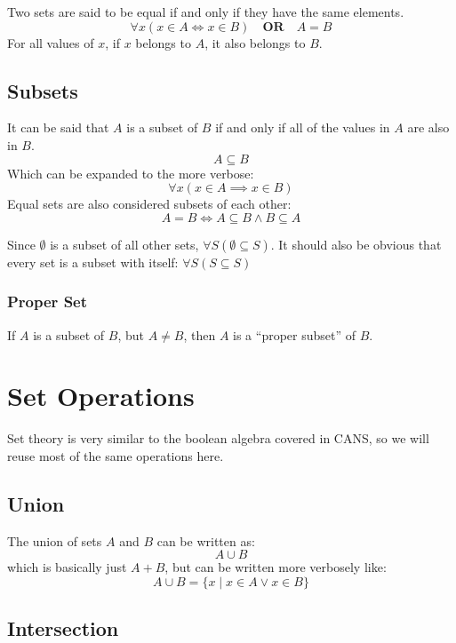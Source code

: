 Two sets are said to be equal if and only if they have the same elements.
\[
    \forall x(x \in A \iff x \in B) \quad \mathrm{\textbf{OR}} \quad A = B
\]
For all values of \(x\), if \(x\) belongs to \(A\), it also belongs to \(B\).

\subsection{Subsets}\label{sub:subsets}

It can be said that \(A\) is a subset of \(B\) if and only if all of the values in \(A\) are also in \(B\).
\[
    A \subseteq B
\]
Which can be expanded to the more verbose:
\[
    \forall x (x \in A \implies x \in B)
\]
Equal sets are also considered subsets of each other:
\[
    A=B \iff A \subseteq B \land B \subseteq A
\]
\begin{note}
    Since \(\emptyset\) is a subset of all other sets, \(\forall S(\emptyset \subseteq S)\).
    It should also be obvious that every set is a subset with itself: \(\forall S ( S \subseteq S )\)
\end{note}

\subsubsection{Proper Set}\label{ssub:proper_set}

If \(A\) is a subset of \(B\), but \(A \neq B\), then \(A\) is a ``proper subset'' of \(B\).

\section{Set Operations}\label{sec:set_operations}

Set theory is very similar to the boolean algebra covered in CANS, so we will reuse most of the same operations here.

\subsection{Union}\label{sub:unionpafour}

The union of sets \(A\) and \(B\) can be written as:
\[
    A \cup B
\]
which is basically just \(A + B\), but can be written more verbosely like:
\[
    A \cup B = \{x \mid x \in A \lor x \in B\}
\]

\subsection{Intersection}\label{sub:intersection}

